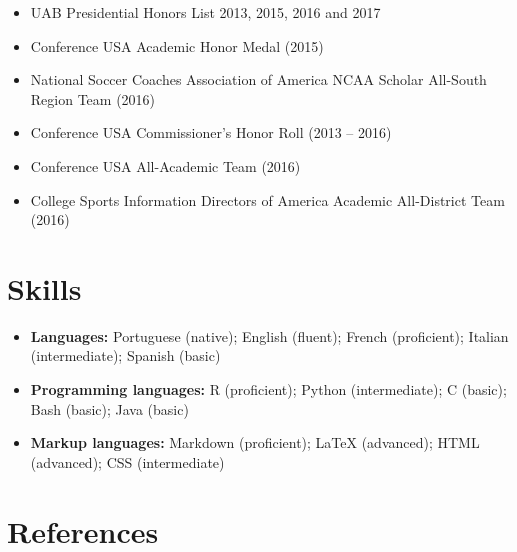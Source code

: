 \documentclass[11pt,a4paper,]{awesome-cv}
\providecommand{\tightlist}{%
	\setlength{\itemsep}{0pt}\setlength{\parskip}{0pt}}
\begin{document}
\begin{itemize}
\tightlist
\item
  UAB Presidential Honors List 2013, 2015, 2016 and 2017
\item
  Conference USA Academic Honor Medal (2015)
\item
  National Soccer Coaches Association of America NCAA Scholar All-South
  Region Team (2016)
\item
  Conference USA Commissioner's Honor Roll (2013 -- 2016)
\item
  Conference USA All-Academic Team (2016)
\item
  College Sports Information Directors of America Academic All-District
  Team (2016)
\end{itemize}

\hypertarget{skills}{%
\section{Skills}\label{skills}}

\begin{itemize}
\item
  \textbf{Languages:} Portuguese (native); English (fluent); French
  (proficient); Italian (intermediate); Spanish (basic)
\item
  \textbf{Programming languages:} R (proficient); Python (intermediate);
  C (basic); Bash (basic); Java (basic)
\item
  \textbf{Markup languages:} Markdown (proficient); LaTeX (advanced);
  HTML (advanced); CSS (intermediate)
\end{itemize}

\hypertarget{references}{%
\section{References}\label{references}}

\begin{cventries}
\end{cventries}



\label{LastPage}~
\end{document}
